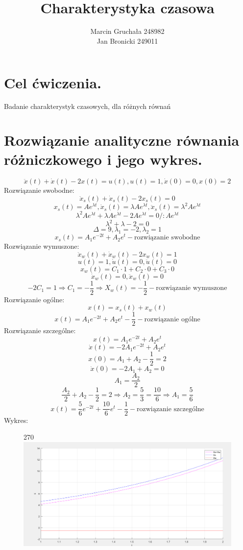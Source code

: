 \documentclass{article}
\title{Charakterystyka czasowa}
\author{Marcin Gruchała 248982\\
Jan Bronicki 249011\\}
\date{}
\begin{document}
\maketitle
\section{Cel ćwiczenia.}
Badanie charakterystyk czasowych, dla różnych równań
\section{Rozwiązanie analityczne równania różniczkowego i jego wykres.}
$$
\ddot{x}(t)+\dot{x}(t)-2x(t)=u(t), u(t)=1, \dot{x}(0)=0, x(0)=2
$$
Rozwiązanie swobodne:
$$
\ddot{x}_s(t)+\dot{x}_s(t)-2x_s(t)=0
$$
$$
x_s(t)=Ae^{\lambda t}, \dot{x}_s(t)=\lambda Ae^{\lambda t}, \ddot{x}_s(t)=\lambda^2 Ae^{\lambda t}
$$
$$
\lambda^2 Ae^{\lambda t}+\lambda Ae^{\lambda t}-2Ae^{\lambda t}=
0/:Ae^{\lambda t}
$$
$$
\lambda^2+\lambda-2=0
$$
$$
\Delta=9, \lambda_1=-2, \lambda_2=1
$$
$$
x_s(t)=A_1e^{-2t}+A_2e^{t} - \text{rozwiązanie swobodne}
$$
Rozwiązanie wymuszone:
$$
\ddot{x}_w(t)+\dot{x}_w(t)-2x_w(t)=1
$$
$$
u(t)=1,\dot{u}(t)=0 ,\ddot{u}(t)=0
$$
$$
x_w(t)=C_1\cdot1+C_2\cdot0+C_3\cdot0
$$
$$
\dot{x}_w(t)=0,\ddot{x}_w(t)=0
$$
$$
-2C_1=1 \Rightarrow C_1=-\frac{1}{2} \Rightarrow X_w(t)=-\frac{1}{2} - \text{rozwiązanie wymuszone}
$$
Rozwiązanie ogólne: 
$$
x(t)=x_s(t)+x_w(t)
$$
$$
x(t)=A_1e^{-2t}+A_2e^{t}-\frac{1}{2}-\text{rozwiązanie ogólne}
$$
Rozwiązanie szczególne:
$$
x(t)=A_1e^{-2t}+A_2e^{t}
$$
$$
\dot{x}(t)=-2A_1e^{-2t}+A_2e^{t}
$$
$$
x(0)=A_1+A_2-\frac{1}{2}=2
$$
$$
\dot{x}(0)=-2A_1+A_2=0
$$
$$
A_1=\frac{A_2}{2}
$$
$$
\frac{A_2}{2}+A_2-\frac{1}{2}=2 \Rightarrow A_2=\frac{5}{3}=\frac{10}{6}
\Rightarrow A_1=\frac{5}{6}
$$
$$
x(t)=\frac{5}{6}e^{-2t}+\frac{10}{6}e^{t}-\frac{1}{2}-\text{rozwiązanie szczególne}
$$
\newpage
Wykres:
\begin{figure}[h!]
    \centering
     \begin{turn}{270}
    \includegraphics[width=1.3\textwidth]{rozwiazanie_analityczne_wykres.png}
    \end{turn}
    \label{fig:my_label}
\end{figure}
\end{document}

